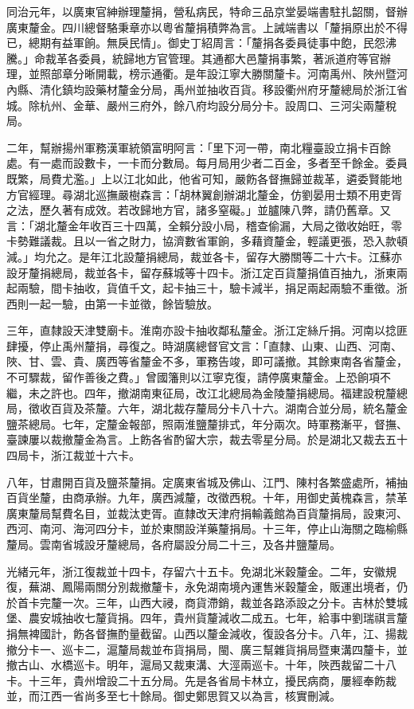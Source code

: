 \begin{pinyinscope}
同治元年，以廣東官紳辦理釐捐，營私病民，特命三品京堂晏端書駐扎韶關，督辦廣東釐金。四川總督駱秉章亦以粵省釐捐積弊為言。上誡端書以「釐捐原出於不得已，總期有益軍餉。無戾民情」。御史丁紹周言：「釐捐各委員徒事中飽，民怨沸騰。」命裁革各委員，統歸地方官管理。其通都大邑釐捐事繁，著派道府等官辦理，並照部章分晰開載，榜示通衢。是年設江寧大勝關釐卡。河南禹州、陜州暨河內縣、清化鎮均設藥材釐金分局，禹州並抽收百貨。移設衢州府牙釐總局於浙江省城。除杭州、金華、嚴州三府外，餘八府均設分局分卡。設周口、三河尖兩釐稅局。

二年，幫辦揚州軍務漢軍統領富明阿言：「里下河一帶，南北糧臺設立捐卡百餘處。有一處而設數卡，一卡而分數局。每月局用少者二百金，多者至千餘金。委員既繁，局費尤濫。」上以江北如此，他省可知，嚴飭各督撫歸並裁革，遴委賢能地方官經理。尋湖北巡撫嚴樹森言：「胡林翼創辦湖北釐金，仿劉晏用士類不用吏胥之法，歷久著有成效。若改歸地方官，諸多窒礙。」並臚陳八弊，請仍舊章。又言：「湖北釐金年收百三十四萬，全賴分設小局，稽查偷漏，大局之徵收始旺，零卡勢難議裁。且以一省之財力，協濟數省軍餉，多藉資釐金，輕議更張，恐入款頓減。」均允之。是年江北設釐捐總局，裁並各卡，留存大勝關等二十六卡。江蘇亦設牙釐捐總局，裁並各卡，留存蘇城等十四卡。浙江定百貨釐捐值百抽九，浙東兩起兩驗，間卡抽收，貨值千文，起卡抽三十，驗卡減半，捐足兩起兩驗不重徵。浙西則一起一驗，由第一卡並徵，餘皆驗放。

三年，直隸設天津雙廟卡。淮南亦設卡抽收鄰私釐金。浙江定絲斤捐。河南以捻匪肆擾，停止禹州釐捐，尋復之。時湖廣總督官文言：「直隸、山東、山西、河南、陜、甘、雲、貴、廣西等省釐金不多，軍務告竣，即可議撤。其餘東南各省釐金，不可驟裁，留作善後之費。」曾國籓則以江寧克復，請停廣東釐金。上恐餉項不繼，未之許也。四年，撤湖南東征局，改江北總局為金陵釐捐總局。福建設稅釐總局，徵收百貨及茶釐。六年，湖北裁存釐局分卡八十六。湖南合並分局，統名釐金鹽茶總局。七年，定釐金報部，照兩淮鹽釐排式，年分兩次。時軍務漸平，督撫、臺諫屢以裁撤釐金為言。上飭各省酌留大宗，裁去零星分局。於是湖北又裁去五十四局卡，浙江裁並十六卡。

八年，甘肅開百貨及鹽茶釐捐。定廣東省城及佛山、江門、陳村各繁盛處所，補抽百貨坐釐，由商承辦。九年，廣西減釐，改徵西稅。十年，用御史黃槐森言，禁革廣東釐局幫費名目，並裁汰吏胥。直隸改天津府捐輸義館為百貨釐捐局，設東河、西河、南河、海河四分卡，並於東關設洋藥釐捐局。十三年，停止山海關之臨榆縣釐局。雲南省城設牙釐總局，各府屬設分局二十三，及各井鹽釐局。

光緒元年，浙江復裁並十四卡，存留六十五卡。免湖北米穀釐金。二年，安徽規復，蕪湖、鳳陽兩關分別裁撤釐卡，永免湖南境內運售米穀釐金，販運出境者，仍於首卡完釐一次。三年，山西大祲，商貨滯銷，裁並各路添設之分卡。吉林於雙城堡、農安城抽收七釐貨捐。四年，貴州貨釐減收二成五。七年，給事中劉瑞祺言釐捐無裨國計，飭各督撫酌量截留。山西以釐金減收，復設各分卡。八年，江、揚裁撤分卡一、巡卡二，滬釐局裁並布貨捐局，閩、廣三幫雜貨捐局暨東溝四釐卡，並撤古山、水橋巡卡。明年，滬局又裁東溝、大涇兩巡卡。十年，陜西裁留二十八卡。十三年，貴州增設二十五分局。先是各省局卡林立，擾民病商，屢經奉飭裁並，而江西一省尚多至七十餘局。御史鄭思賀又以為言，核實刪減。


\end{pinyinscope}
